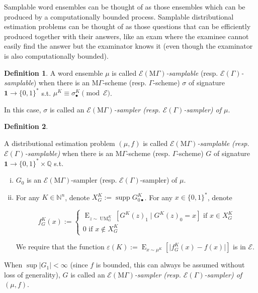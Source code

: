 \documentclass{article}
\numberwithin{equation}{section}
\theoremstyle{definition}
\newtheorem{definition}{Definition}[section]
\theoremstyle{plain}
\newcommand{\Bool}{\{0,1\}}
\newcommand{\Words}{{\Bool^*}}
\DeclareMathOperator{\Supp}{supp}
\DeclareMathOperator{\E}{E}
\DeclareMathOperator{\UM}{UM}
\newcommand{\Nats}{\mathbb{N}}
\newcommand{\Rats}{\mathbb{Q}}
\newcommand{\Abs}[1]{\lvert #1 \rvert}
\newcommand{\MGrow}{\mathrm{M}\Gamma}
\newcommand{\Fall}{\mathcal{E}}
\newcommand{\EG}{\Fall(\Gamma)}
\newcommand{\EMG}{\Fall(\MGrow)}
\begin{document}
Samplable word ensembles can be thought of as those ensembles which can be produced by a computationally bounded process. Samplable distributional estimation problems can be thought of as those questions that can be efficiently produced together with their answers, like an exam where the examinee cannot easily find the answer but the examinator knows it (even though the examinator is also computationally bounded).

\begin{samepage}
\begin{definition}

A word ensemble $\mu$ is called \emph{$\EMG$-samplable} (resp. \emph{$\EG$-samplable}) when there is an $\MGrow$-scheme (resp. $\Gamma$-scheme) $\sigma$ of signature ${\bm{1} \rightarrow \Words}$  s.t. $\mu^{K} \equiv \sigma_\bullet^K \pmod \Fall$.

In this case, $\sigma$ is called an \emph{$\EMG$-sampler (resp. $\EG$-sampler) of $\mu$}.

\end{definition}
\end{samepage}

\begin{samepage}
\begin{definition}
\label{def:smp_prob}

A distributional estimation problem $(\mu,f)$ is called \emph{$\EMG$-samplable (resp. $\EG$-samplable)} when there is an $\MGrow$-scheme (resp. $\Gamma$-scheme) $G$ of signature $\bm{1} \rightarrow \Words \times \Rats$ s.t. 

\begin{enumerate}[(i)]

\item $G_0$ is an $\EMG$-sampler (resp. $\EG$-sampler) of $\mu$.

\item For any $K \in \Nats^n$, denote $X_{G}^K:=\Supp G_{0\bullet}^K$. For any $x \in \Words$, denote 

$$f_G^K(x):=\begin{cases}\E_{z \sim\UM_G^K}[G^K(z)_1 \mid G^K(z)_0 = x] \text{ if } x \in X_{G}^K \\ 0 \text{ if } x \not\in X_{G}^K \end{cases}$$

We require that the function $\varepsilon(K):=\E_{x \sim \mu^{K}}[\Abs{f_G^K(x)-f(x)}]$ is in $\Fall$.

\end{enumerate}

When $\sup{\Abs{G_1}} < \infty$ (since $f$ is bounded, this can always be assumed without loss of generality), $G$ is called an \emph{$\EMG$-sampler (resp. $\EG$-sampler) of $(\mu,f)$}.

\end{definition}
\end{samepage}
\end{document}

